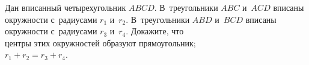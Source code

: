 \begin{problems}
\item
Дан вписанный четырехугольник $ABCD$.
В~треугольники $ABC$ и~$ACD$ вписаны окружности с~радиусами $r_1$ и~$r_2$.
В~треугольники $ABD$ и~$BCD$ вписаны окружности с~радиусами $r_3$ и~$r_4$.
Докажите, что
\\
\subproblem центры этих окружностей образуют прямоугольник;
\\
\subproblem $r_1 + r_2 = r_3 + r_4$.

\end{problems}

